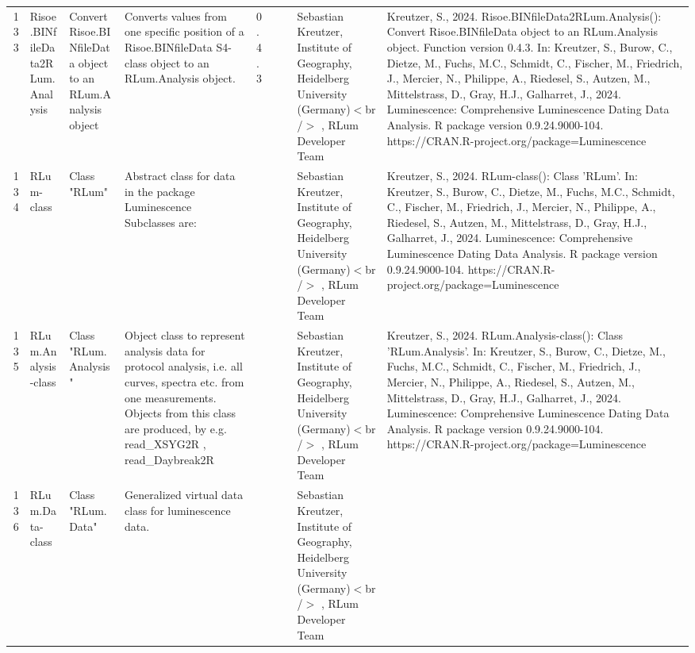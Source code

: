 \begin{table}[ht]
\begin{tabular}{rllllllll}
 \\ 
  133 & Risoe.BINfileData2RLum.Analysis & Convert Risoe.BINfileData object to an RLum.Analysis object & Converts values from one specific position of a Risoe.BINfileData S4-class object to an RLum.Analysis object. & 0.4.3
 &  &  & Sebastian Kreutzer, Institute of Geography, Heidelberg University (Germany)$<$br /$>$ , RLum Developer Team & Kreutzer, S., 2024. Risoe.BINfileData2RLum.Analysis(): Convert Risoe.BINfileData object to an RLum.Analysis object. Function version 0.4.3. In: Kreutzer, S., Burow, C., Dietze, M., Fuchs, M.C., Schmidt, C., Fischer, M., Friedrich, J., Mercier, N., Philippe, A., Riedesel, S., Autzen, M., Mittelstrass, D., Gray, H.J., Galharret, J., 2024. Luminescence: Comprehensive Luminescence Dating Data Analysis. R package version 0.9.24.9000-104. https://CRAN.R-project.org/package=Luminescence
 \\ 
  134 & RLum-class & Class  "RLum" & Abstract class for data in the package Luminescence Subclasses are: &  &  &  & Sebastian Kreutzer, Institute of Geography, Heidelberg University (Germany)$<$br /$>$ , RLum Developer Team & Kreutzer, S., 2024. RLum-class(): Class 'RLum'. In: Kreutzer, S., Burow, C., Dietze, M., Fuchs, M.C., Schmidt, C., Fischer, M., Friedrich, J., Mercier, N., Philippe, A., Riedesel, S., Autzen, M., Mittelstrass, D., Gray, H.J., Galharret, J., 2024. Luminescence: Comprehensive Luminescence Dating Data Analysis. R package version 0.9.24.9000-104. https://CRAN.R-project.org/package=Luminescence
 \\ 
  135 & RLum.Analysis-class & Class  "RLum.Analysis" & Object class to represent analysis data for protocol analysis, i.e. all curves, spectra etc. from one measurements. Objects from this class are produced, by e.g.  read\_XSYG2R ,  read\_Daybreak2R &  &  &  & Sebastian Kreutzer, Institute of Geography, Heidelberg University (Germany)$<$br /$>$ , RLum Developer Team & Kreutzer, S., 2024. RLum.Analysis-class(): Class 'RLum.Analysis'. In: Kreutzer, S., Burow, C., Dietze, M., Fuchs, M.C., Schmidt, C., Fischer, M., Friedrich, J., Mercier, N., Philippe, A., Riedesel, S., Autzen, M., Mittelstrass, D., Gray, H.J., Galharret, J., 2024. Luminescence: Comprehensive Luminescence Dating Data Analysis. R package version 0.9.24.9000-104. https://CRAN.R-project.org/package=Luminescence
 \\ 
  136 & RLum.Data-class & Class  "RLum.Data" & Generalized virtual data class for luminescence data. &  &  &  & Sebastian Kreutzer, Institute of Geography, Heidelberg University (Germany)$<$br /$>$ , RLum Developer Team &  \\ 

\end{tabular}
\end{table}
